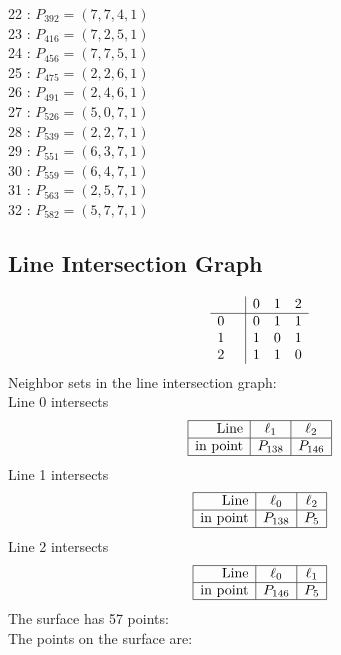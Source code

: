 \documentclass{article}
\begin{document}
{\begin{multicols}{2}
22 : $P_{392}=( 7, 7, 4, 1 )$\\
23 : $P_{416}=( 7, 2, 5, 1 )$\\
24 : $P_{456}=( 7, 7, 5, 1 )$\\
25 : $P_{475}=( 2, 2, 6, 1 )$\\
26 : $P_{491}=( 2, 4, 6, 1 )$\\
27 : $P_{526}=( 5, 0, 7, 1 )$\\
28 : $P_{539}=( 2, 2, 7, 1 )$\\
29 : $P_{551}=( 6, 3, 7, 1 )$\\
30 : $P_{559}=( 6, 4, 7, 1 )$\\
31 : $P_{563}=( 2, 5, 7, 1 )$\\
32 : $P_{582}=( 5, 7, 7, 1 )$\\
\end{multicols}
\subsection*{Line Intersection Graph}
{\arraycolsep=1pt
$$
\begin{array}{rr|*{3}r}
 &  & 0 & 1 & 2\\
\hline
0 &  & 0 & 1 & 1\\
1 &  & 1 & 0 & 1\\
2 &  & 1 & 1 & 0\\
\end{array}
$$
}%
Neighbor sets in the line intersection graph:\\
Line 0 intersects 
$$
\begin{array}{|r*{2}{|c}|}
\hline
\mbox{Line}  & \ell_{1} & \ell_{2}\\
\hline
\mbox{in point}  & P_{138} & P_{146}\\
\hline
\end{array}
$$
Line 1 intersects 
$$
\begin{array}{|r*{2}{|c}|}
\hline
\mbox{Line}  & \ell_{0} & \ell_{2}\\
\hline
\mbox{in point}  & P_{138} & P_{5}\\
\hline
\end{array}
$$
Line 2 intersects 
$$
\begin{array}{|r*{2}{|c}|}
\hline
\mbox{Line}  & \ell_{0} & \ell_{1}\\
\hline
\mbox{in point}  & P_{146} & P_{5}\\
\hline
\end{array}
$$
The surface has 57 points:\\
The points on the surface are:\\
}
\end{document}
